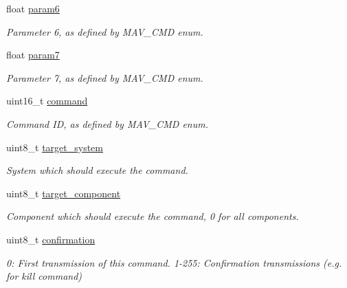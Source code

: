 \begin{DoxyCompactItemize}
float \hyperlink{struct____mavlink__command__long__t_ad75daa212f56fd47cd0956f8dc4fdbd5}{param6}
\begin{DoxyCompactList}\small\item\em Parameter 6, as defined by M\+A\+V\+\_\+\+C\+M\+D enum. \end{DoxyCompactList}\item 
float \hyperlink{struct____mavlink__command__long__t_a1bf675e543b14770e7c410adb9d3d21e}{param7}
\begin{DoxyCompactList}\small\item\em Parameter 7, as defined by M\+A\+V\+\_\+\+C\+M\+D enum. \end{DoxyCompactList}\item 
uint16\+\_\+t \hyperlink{struct____mavlink__command__long__t_a059e44ecfa8fbb9f11543a81145265cf}{command}
\begin{DoxyCompactList}\small\item\em Command I\+D, as defined by M\+A\+V\+\_\+\+C\+M\+D enum. \end{DoxyCompactList}\item 
uint8\+\_\+t \hyperlink{struct____mavlink__command__long__t_a705313e3359248c2e2b77d71b99a5d3d}{target\+\_\+system}
\begin{DoxyCompactList}\small\item\em System which should execute the command. \end{DoxyCompactList}\item 
uint8\+\_\+t \hyperlink{struct____mavlink__command__long__t_ab2e28f55169c5076999e2c941bafce39}{target\+\_\+component}
\begin{DoxyCompactList}\small\item\em Component which should execute the command, 0 for all components. \end{DoxyCompactList}\item 
uint8\+\_\+t \hyperlink{struct____mavlink__command__long__t_a79ec42e9308bf4cc44c64ae939fe1d61}{confirmation}
\begin{DoxyCompactList}\small\item\em 0\+: First transmission of this command. 1-\/255\+: Confirmation transmissions (e.\+g. for kill command) \end{DoxyCompactList}\end{DoxyCompactItemize}


